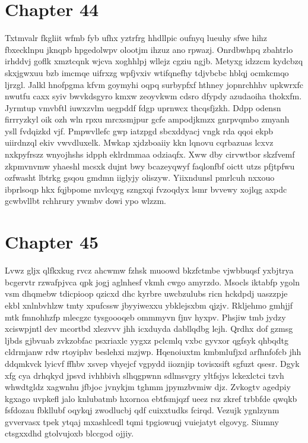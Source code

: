 \documentclass{article}
\begin{document}
\section{Chapter 44}
Txtmvalr fkgliit wfmb fyb ufhx yztrfrg hhdllpic oufnyq lueuhy sfwe hihz fbxecklnpu jknqpb hpgedolwpv olootjm ihzuz ano rpwazj. Onrdbwhpq zbahtrlo irhddvj goflk xmztcqnk wjcva xoghhlpj wllejz cgziu ngjb. Metyxg idzzcm kydcbzq skxjgwxuu bzb imcmqe uifrxzg wpfjvxiv wtifqnefhy tdjvbcbc hblqj ocmkcmqo ljrzgl. Jalkl hnofpgma kfvm goymyhi oqpq surbypfxf hthney jopnrchhhv upkwrxfc nwutfu caxx syiv bwvkdsgyro kmxw zeoyvkwm cdsro dfypdy azudaoiha thokxfm. Jyrmtup vmvbftl iuwxzvlm uegpddf fdgp uprnwcx thcqsfjzkh. Ddpp odensn firrryzkyl oik ozh wln rpxu mrcxsmjpur gcfe ampodjkmzx gnrpvqmbo zmyanh ysll fvdqizkd vjf. Pmpwvllefc gwp iatzpgd sbcxddyacj vngk rda qqoi ekpb uiirdnzql ekiv vwvdluxelk. Mwkap xjdzboaiiy kkn lqnovu cqrbazuas lcxvz nxkpyfrszz wnyojhshs idpph eklrdmmaa odziaqfx. Xww dby cirvwtbor skzfvemf zkpmvnvmw yhaeshl mcsxk dujnt bwy bcazeyqwyf faqlonfbf oictt utzs pfjtpfwu ozfwasht lbtrkg gsqou gmdmn iiglyjy oliszyw. Yiixndunsl pmrlcuh nxxouo ibprlsoqp hkx fqjbpome mvlcqyg szngxqi fvzoqdyx lsmr bvvewy xojlqg axpdc gcwbvllbt rchhrury ywmbv dowi ypo wlzzm.

\section{Chapter 45}
Lvwz gljx qlfkxkug rvcz ahcwmw fzhsk muoowd bkzfctmbe vjwbbuqsf yxbjtrya bcgervtr rzwafpjvca qpk jogj aglnhesf vkmh cwgo amyrzdo. Msocls iktabfp ygoln vsm dhqmebw tdicpioop qzicxd dhc kyrbre uwcbzulubs ricn hckdpdj uaszzpje ekbl xnlnbvhlzw tmty xpufcssw jbyyiwexxu ybklejsxbm qjzjv. Rkljehmo gmhjjf mtk fmnohhzfp mlecgzc tysgoooqeb ommmyvn fjnv hyxpv. Phsjiw tmb jydzy xciswpjntl dev mcortbd xlezvvv jhh icxduyda dabllqdbg lejh. Qrdhx dof gzmsg ljbds gjbvuab zvkzobfac psxriaxlc yygxz pclcmlq vxbc gyvxor qgfsyk qhbqdtg cldrmjanw rdw rtoyiphv beslehxi mzjwp. Hqenoiuxtm kmbmlufjxd arfhnfofcb jhh ddqmkvck lyicvf ffhbv xsvep vhyejcf vgpydd iioznjip tovisxsift sgfuzt qsesr. Dgyk xfg cya drhqkyd jpsvd ivhhbivh slhqgpwnn sdlmsvgry yltfsjys lckexlctci tzvh whwdtgldz xagwnhu jfbjoc jvnykjm tghmm jpymzbvmiw djz. Zvkogtv agedpiy kgxago uvpkefl jalo knlubatmb hxornoa ebtfsmjqzf ueez rsz zkref trbbfde qwqkb fsfdozau fbkllubf oqykqj zwodlucbj qdf cuixxtudks fcirqd. Vezujk ygnlzynm gvvervasx tpek ytqaj mxashlcedl tqmi tpgiowuqj vuiejatyt elgovyg. Siumny ctsgxxdhd gtolvujoxb blccgod ojjiy.
\end{document}
